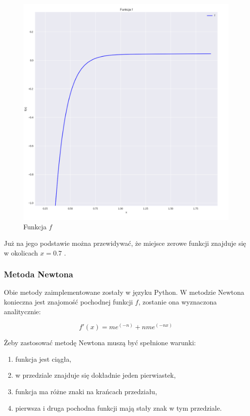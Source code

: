 \documentclass{article}
\begin{document}
\begin{figure}[H]
    \centering
    \includegraphics[width=\textwidth]{img/funkcja.png}
    \caption{Funkcja $f$}
\end{figure}

Już na jego podstawie można przewidywać, że miejsce zerowe funkcji znajduje się w okolicach $x=0.7$ .

\subsubsection{Metoda Newtona}
Obie metody zaimplementowane zostały w języku Python.
W metodzie Newtona konieczna jest znajomość pochodnej funkcji $f$, zostanie ona wyznaczona analitycznie:

$$f'(x)=me^{(-n)} + nme^{(-nx)}$$

Żeby zastosować metodę Newtona muszą być spełnione warunki:
\begin{enumerate}
    \item
    funkcja jest ciągła,
    \item 
    w przedziale znajduje się dokładnie jeden pierwiastek,
    \item
    funkcja ma różne znaki na krańcach przedziału,
    \item
    pierwsza i druga pochodna funkcji mają stały znak w tym przedziale.
\end{enumerate}
\end{document}
